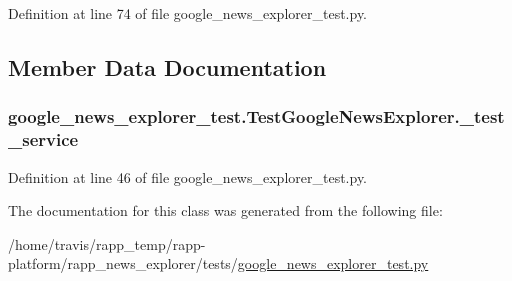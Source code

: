 Definition at line 74 of file google\-\_\-news\-\_\-explorer\-\_\-test.\-py.



\subsection{Member Data Documentation}
\hypertarget{classgoogle__news__explorer__test_1_1TestGoogleNewsExplorer_a017bde9dead67bad3addf7f8e43e11b5}{
\subsubsection[{\-\_\-test\-\_\-service}]{\setlength{\rightskip}{0pt plus 5cm}google\-\_\-news\-\_\-explorer\-\_\-test.\-Test\-Google\-News\-Explorer.\-\_\-test\-\_\-service\hspace{0.3cm}{\ttfamily [private]}}}\label{classgoogle__news__explorer__test_1_1TestGoogleNewsExplorer_a017bde9dead67bad3addf7f8e43e11b5}


Definition at line 46 of file google\-\_\-news\-\_\-explorer\-\_\-test.\-py.



The documentation for this class was generated from the following file\-:\begin{DoxyCompactItemize}
\item 
/home/travis/rapp\-\_\-temp/rapp-\/platform/rapp\-\_\-news\-\_\-explorer/tests/\hyperlink{google__news__explorer__test_8py}{google\-\_\-news\-\_\-explorer\-\_\-test.\-py}\end{DoxyCompactItemize}

